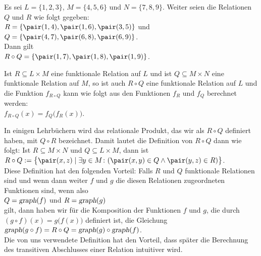 \example
Es sei $L = \{1,2,3\}$, $M = \{4,5,6\}$ und $N = \{7,8,9\}$.  Weiter seien die Relationen
$Q$ und $R$ wie folgt gegeben: \\[0.2cm]
\hspace*{1.3cm} $R = \{ \pair(1,4), \pair(1,6), \pair(3,5) \}$ \quad und \quad
                $Q = \{ \pair(4,7), \pair(6,8), \pair(6,9) \}$. \\[0.2cm]
Dann gilt \\[0.2cm]
\hspace*{1.3cm} $R \circ Q = \{ \pair(1,7), \pair(1,8), \pair(1,9) \}$.
\eox


\noindent
Ist $R \subseteq L \times M$ eine funktionale Relation auf $L$ und 
ist $Q \subseteq M \times N$ eine funktionale Relation auf $M$, so ist auch 
$R \circ Q$ eine funktionale Relation auf $L$ und die Funktion $f_{R \circ Q}$
kann wie folgt aus den Funktionen $f_R$ und $f_Q$ berechnet werden:
\\[0.2cm]
\hspace*{1.3cm}
$f_{R \circ Q}(x) = f_Q\bigl(f_R(x)\bigr)$.

\remark
In einigen Lehrbüchern wird das relationale Produkt, 
das wir als $R \circ Q$ definiert haben, mit $Q \circ R$
bezeichnet. Damit lautet die Definition von $R \circ Q$  dann wie folgt:
Ist $R \subseteq M \times N$ und $Q \subseteq L \times M$, dann ist 
\\[0.2cm]
\hspace*{1.3cm}
$R \circ Q := \bigl\{ \pair(x,z) \mid \exists y \in M \colon(\pair(x,y) \in Q \wedge \pair(y,z) \in R) \bigr\}$.
\\[0.2cm]
Diese Definition hat den folgenden Vorteil: Falls $R$ und $Q$ funktionale Relationen sind und wenn
dann weiter $f$ und $g$ die diesen Relationen zugeordneten Funktionen sind, wenn also 
\\[0.2cm]
\hspace*{1.3cm}
$Q = \textsl{graph}(f)$ \quad und \quad $R = \textsl{graph}(g)$
\\[0.2cm]
gilt, dann haben wir für die Komposition der Funktionen $f$ und $g$, die durch $(g \circ
f)(x) = g\bigl(f(x)\bigr)$ 
definiert ist, die Gleichung
\\[0.2cm]
\hspace*{1.3cm}
$\textsl{graph}(g \circ f) = R \circ Q = \textsl{graph}(g) \circ \textsl{graph}(f)$.
\\[0.2cm]
 Die von uns verwendete Definition hat den Vorteil, dass später die Berechnung des transitiven
Abschlusses einer Relation intuitiver wird.  \eox



